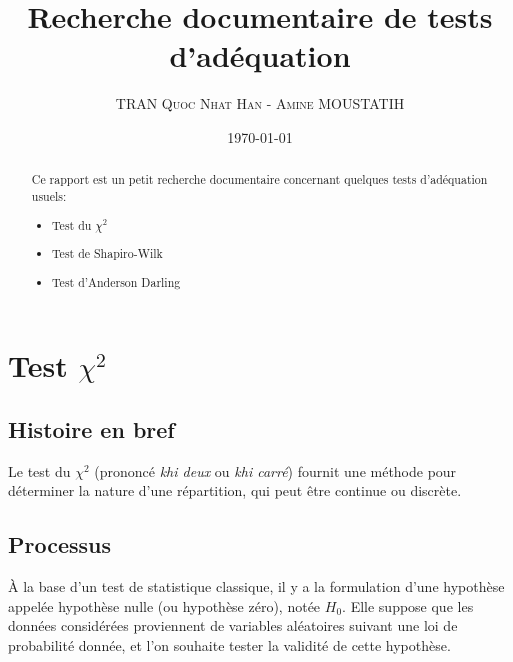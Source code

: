 \documentclass[12pt,a4paper]{article}
\author{\textsc{TRAN Quoc Nhat Han} - \textsc{Amine MOUSTATIH}}
\title{Recherche documentaire de tests d'adéquation}
\date{\today}
\begin{document}
\maketitle 
\renewcommand{\contentsname}{Sommaire}
\tableofcontents

\clearpage

\begin{abstract}
Ce rapport est un petit recherche documentaire concernant quelques tests d'adéquation usuels:
\begin{itemize}
\item Test du $\chi^2$
\item Test de Shapiro-Wilk
\item Test d'Anderson Darling
\end{itemize}
\end{abstract}

\clearpage

\section{Test $\chi^2$}

\subsection{Histoire en bref}
Le test du $\chi^2$ (prononcé \emph{khi deux} ou \emph{khi carré}) fournit une méthode pour déterminer la nature d'une répartition, qui peut être continue ou discrète.

\subsection{Processus}
À la base d'un test de statistique classique, il y a la formulation d'une hypothèse appelée hypothèse nulle (ou hypothèse zéro), notée $H_0$. Elle suppose que les données considérées proviennent de variables aléatoires suivant une loi de probabilité donnée, et l'on souhaite tester la validité de cette hypothèse.
\end{document}

